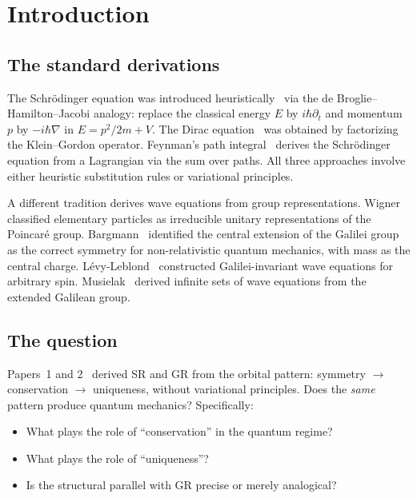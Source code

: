 \documentclass[12pt]{article}
\theoremstyle{plain}
\theoremstyle{definition}
\theoremstyle{remark}
\begin{document}
\section{Introduction}
\label{sec:intro}

\subsection{The standard derivations}

The Schr\"odinger equation was introduced heuristically~\cite{schrodinger1926} via the de Broglie--Hamilton--Jacobi analogy: replace the classical energy $E$ by $i\hbar\partial_t$ and momentum $p$ by $-i\hbar\nabla$ in $E = p^2/2m + V$. The Dirac equation~\cite{dirac1928} was obtained by factorizing the Klein--Gordon operator. Feynman's path integral~\cite{feynman1948} derives the Schr\"odinger equation from a Lagrangian via the sum over paths. All three approaches involve either heuristic substitution rules or variational principles.

A different tradition derives wave equations from group representations. Wigner~\cite{wigner1939} classified elementary particles as irreducible unitary representations of the Poincar\'e group. Bargmann~\cite{bargmann1954} identified the central extension of the Galilei group as the correct symmetry for non-relativistic quantum mechanics, with mass as the central charge. L\'evy-Leblond~\cite{levyleblond1967} constructed Galilei-invariant wave equations for arbitrary spin. Musielak~\cite{musielak2021} derived infinite sets of wave equations from the extended Galilean group.

\subsection{The question}

Papers~1 and 2~\cite{nembe2026p1,nembe2026p2} derived SR and GR from the orbital pattern: symmetry $\to$ conservation $\to$ uniqueness, without variational principles. Does the \emph{same} pattern produce quantum mechanics? Specifically:
\begin{itemize}
    \item What plays the role of ``conservation'' in the quantum regime?
    \item What plays the role of ``uniqueness''?
    \item Is the structural parallel with GR precise or merely analogical?
\end{itemize}
\end{document}

